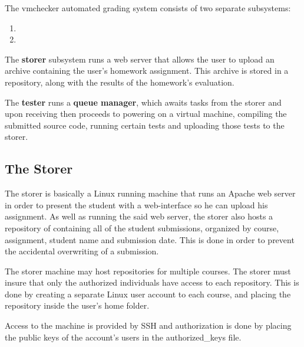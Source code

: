The vmchecker automated grading system consists of two separate subsystems:
\begin{enumerate}
\item {}
\item {}
\end{enumerate}

\begin{center}
\end{center}

The {\bf storer} subsystem runs a web server that allows the user to upload an archive
containing the user's homework assignment. This archive is stored in a repository,
along with the results of the homework's evaluation.

The {\bf tester} runs a {\bf queue manager}, which awaits tasks from the storer and upon
receiving then proceeds to powering on a virtual machine, compiling the submitted
source code, running certain tests and uploading those tests to the storer.


\subsection{The Storer}
\label{sub-sec:storer}

The storer is basically a Linux running machine that runs an Apache web server
in order to present the student with a web-interface so he can upload his
assignment. As well as running the said web server, the storer also hosts a 
repository of containing all of the student submissions, organized by course,
assignment, student name and submission date. This is done in order to prevent
the accidental overwriting of a submission.

\begin{center}
\end{center}

The storer machine may host repositories for multiple courses. The storer
must insure that only the authorized individuals have access to each repository.
This is done by creating a separate Linux user account to each course, and placing
the repository inside the user's home folder.

Access to the machine is provided by SSH and authorization is done by placing
the public keys of the account's users in the authorized_keys file.

